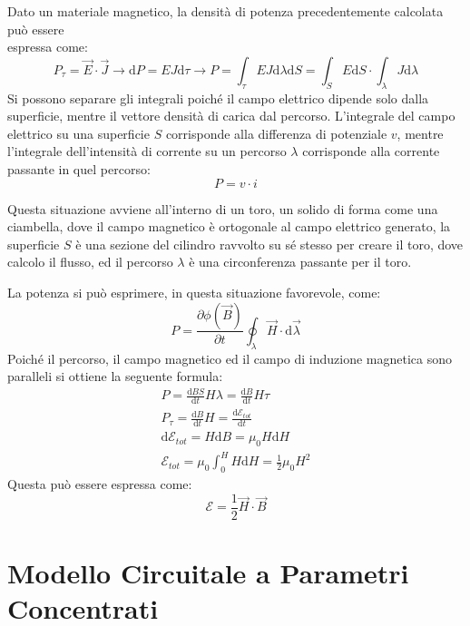 \documentclass{article}
\newcommand{\df}{\mathrm{d}}
\numberwithin{equation}{subsection}
\begin{document}
Dato un materiale magnetico, la densità di potenza precedentemente calcolata può essere\\espressa come:
\begin{equation*}
    P_\tau=\vec{E}\cdot\vec{J}\to \df P=EJ\df\tau\to P=\displaystyle\int_{\tau}EJ\df\lambda \df S=\int_{S}E\df S\cdot\int_{\lambda}J\df\lambda
\end{equation*}
Si possono separare gli integrali poiché il campo elettrico dipende solo dalla superficie, mentre il vettore densità di carica dal percorso. L'integrale del campo elettrico 
su una superficie $S$ corrisponde alla differenza di potenziale $v$, mentre l'integrale dell'intensità di corrente su un percorso $\lambda$ corrisponde alla corrente passante 
in quel percorso: 
\begin{equation}
    P=v\cdot i
\end{equation}

Questa situazione avviene all'interno di un toro, un solido di forma come una ciambella, dove il campo magnetico è ortogonale al campo elettrico generato, la superficie $S$ 
è una sezione del cilindro ravvolto su sé stesso per creare il toro, dove calcolo il flusso, ed il percorso $\lambda$ è una circonferenza passante per il toro. 

La potenza si può esprimere, in questa situazione favorevole, come:
\begin{equation*}
    P=\displaystyle\frac{\partial \phi(\vec{B})}{\partial t}\oint_{\lambda}\vec{H}\cdot \df\vec{\lambda}
\end{equation*}
Poiché il percorso, il campo magnetico ed il campo di induzione magnetica sono paralleli si ottiene la seguente formula:
\begin{gather*}
    P=\displaystyle\frac{\df BS}{\df t}H\lambda=\frac{\df B}{\df t}H\tau\\
    P_{\tau}=\displaystyle\frac{\df B}{\df t}H=\frac{\df\mathscr{E}_{tot}}{\df t}\\
    \df\mathscr{E}_{tot}=H\df B=\mu_0H\df H\\
    \mathscr{E}_{tot}=\displaystyle\mu_0\int_0^HH\df H=\frac{1}{2}\mu_0H^2
\end{gather*}
Questa può essere espressa come:
\begin{equation}
    \mathscr{E}=\displaystyle\frac{1}{2}\vec{H}\cdot\vec{B}
\end{equation}

\clearpage

\section{Modello Circuitale a Parametri Concentrati}
\end{document}
